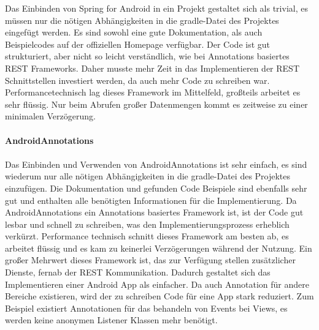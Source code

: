 Das Einbinden von Spring for Android in ein Projekt gestaltet sich als trivial, es müssen nur die nötigen Abhängigkeiten in die gradle-Datei des Projektes eingefügt werden. Es sind sowohl eine gute Dokumentation, als auch Beispielcodes auf der offiziellen Homepage verfügbar. Der Code ist gut strukturiert, aber nicht so leicht verständlich, wie bei Annotations basiertes REST Frameworks. Daher musste mehr Zeit in das Implementieren der REST Schnittstellen investiert werden, da auch mehr Code zu schreiben war.  Performancetechnisch lag dieses Framework im Mittelfeld, großteils arbeitet es sehr flüssig. Nur beim Abrufen großer Datenmengen kommt es zeitweise zu einer minimalen Verzögerung.
\\\\
{\large \textbf{AndroidAnnotations}}\\\\
Das Einbinden und Verwenden von AndroidAnnotations ist sehr einfach, es sind wiederum nur alle nötigen Abhängigkeiten in die gradle-Datei des Projektes einzufügen. Die Dokumentation und gefunden Code Beispiele sind ebenfalls sehr gut und enthalten alle benötigten Informationen für die Implementierung. Da AndroidAnnotations ein Annotations basiertes Framework ist, ist der Code gut lesbar und schnell zu schreiben, was den Implementierungsprozess erheblich verkürzt. Performance technisch schnitt dieses Framework am besten ab, es arbeitet flüssig und es kam zu keinerlei Verzögerungen während der Nutzung. Ein großer Mehrwert dieses Framework ist, das zur Verfügung stellen zusätzlicher Dienste, fernab der REST Kommunikation. Dadurch gestaltet sich das Implementieren einer Android App als einfacher. Da auch Annotation für andere Bereiche existieren, wird der zu schreiben Code für eine App stark reduziert. Zum Beispiel existiert Annotationen für das behandeln von Events bei Views, es werden keine anonymen Listener Klassen mehr benötigt.